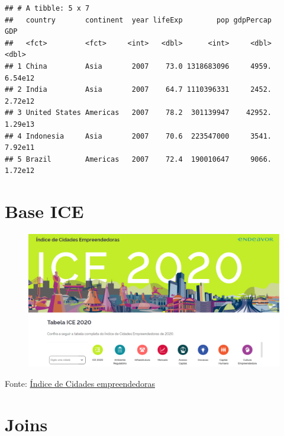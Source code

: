 \documentclass[
]{article}
\newenvironment{Shaded}{\begin{snugshade}}{\end{snugshade}}
\newcommand{\DataTypeTok}[1]{\textcolor[rgb]{0.13,0.29,0.53}{#1}}
\newcommand{\KeywordTok}[1]{\textcolor[rgb]{0.13,0.29,0.53}{\textbf{#1}}}
\newcommand{\NormalTok}[1]{#1}
\newcommand{\StringTok}[1]{\textcolor[rgb]{0.31,0.60,0.02}{#1}}
\begin{document}
\begin{verbatim}
## # A tibble: 5 x 7
##   country       continent  year lifeExp        pop gdpPercap     GDP
##   <fct>         <fct>     <int>   <dbl>      <int>     <dbl>   <dbl>
## 1 China         Asia       2007    73.0 1318683096     4959. 6.54e12
## 2 India         Asia       2007    64.7 1110396331     2452. 2.72e12
## 3 United States Americas   2007    78.2  301139947    42952. 1.29e13
## 4 Indonesia     Asia       2007    70.6  223547000     3541. 7.92e11
## 5 Brazil        Americas   2007    72.4  190010647     9066. 1.72e12
\end{verbatim}

\hypertarget{base-ice}{%
\section{Base ICE}\label{base-ice}}

\begin{figure}

{\centering \includegraphics[width=1\linewidth,height=1\textheight]{imagem/ice} 

}

\caption{ }\label{fig:ice, figures-side}
\end{figure}

Fonte: \href{https://ice.enap.gov.br/}{Índice de Cidades empreendedoras}

\hypertarget{joins}{%
\section{Joins}\label{joins}}

\begin{Shaded}
\end{Shaded}
\end{document}
